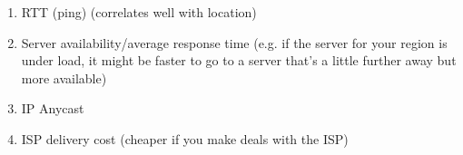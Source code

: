 \documentclass{report}
\begin{document}
\begin{problem}
\begin{answer}{24em}
\begin{enumerate}
\begin{enumerate}
    \item RTT (ping) (correlates well with location)
    \item Server availability/average response time (e.g. if the server for
          your region is under load, it might be faster to go to a server
          that's a little further away but more available)
    \item IP Anycast
    \item ISP delivery cost (cheaper if you make deals with the ISP)
    \end{enumerate}

  \end{enumerate}
\end{answer}

\end{problem}
\end{document}

